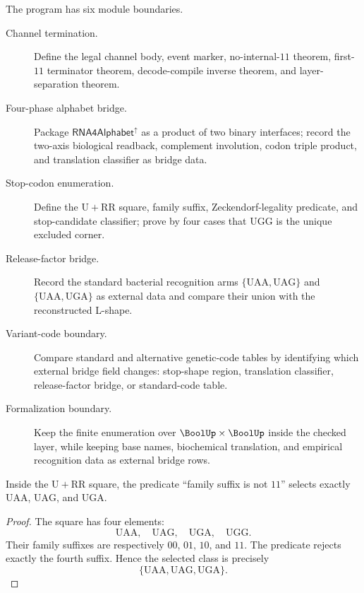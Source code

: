 \begin{definition}
\label{def:philosophy-zterm-research-module-boundaries}
The program has six module boundaries.
\begin{description}
  \item[Channel termination.]
  Define the legal channel body, event marker, no-internal-$11$
  theorem, first-$11$ terminator theorem, decode-compile inverse
  theorem, and
  layer-separation theorem.

  \item[Four-phase alphabet bridge.]
  Package $\mathsf{RNA4Alphabet}^{\uparrow}$ as a product of two
  binary interfaces; record the two-axis biological readback,
  complement involution, codon triple product, and translation
  classifier as bridge data.

  \item[Stop-codon enumeration.]
  Define the $\mathrm{U}+\mathrm{RR}$ square, family suffix,
  Zeckendorf-legality predicate, and stop-candidate classifier; prove by
  four cases that $\mathrm{UGG}$ is the unique excluded corner.

  \item[Release-factor bridge.]
  Record the standard bacterial recognition arms
  $\{\mathrm{UAA},\mathrm{UAG}\}$ and
  $\{\mathrm{UAA},\mathrm{UGA}\}$ as external data and compare their
  union with the reconstructed L-shape.

  \item[Variant-code boundary.]
  Compare standard and alternative genetic-code tables by identifying
  which external bridge field changes: stop-shape region, translation
  classifier, release-factor bridge, or standard-code table.

  \item[Formalization boundary.]
  Keep the finite enumeration over $\BoolUp\times\BoolUp$ inside the
  checked layer, while keeping base names, biochemical translation, and
  empirical recognition data as external bridge rows.
\end{description}
\end{definition}

\begin{theorem}
\label{thm:philosophy-finite-stop-square-enumeration-target}
Inside the $\mathrm{U}+\mathrm{RR}$ square, the predicate
``family suffix is not $11$'' selects exactly
$\mathrm{UAA}$, $\mathrm{UAG}$, and $\mathrm{UGA}$.
\end{theorem}
\begin{proof}
The square has four elements:
$$
  \mathrm{UAA},\quad \mathrm{UAG},\quad
  \mathrm{UGA},\quad \mathrm{UGG}.
$$
Their family suffixes are respectively $00$, $01$, $10$, and $11$.
The predicate rejects exactly the fourth suffix. Hence the selected
class is precisely
$$
  \{\mathrm{UAA},\mathrm{UAG},\mathrm{UGA}\}.
$$
\end{proof}

